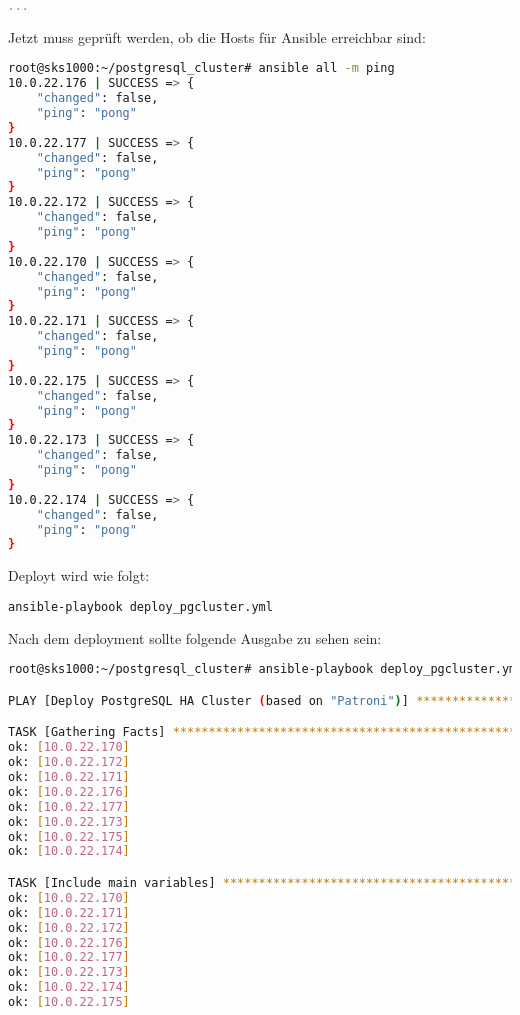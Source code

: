 \begin{flushleft}
\begin{lstlisting}[language=yaml, caption=Testsystem - Deployment - main.yml,captionpos=b,label={lst:testsystem-deployment-main.yml},breaklines=true]
...

    \end{lstlisting}
    Jetzt muss geprüft werden, ob die Hosts für Ansible erreichbar sind:
    \lstset{style=gra_codestyle}
    \begin{lstlisting}[language=bash, caption=Deploy - Anhang - Ansible Ping,captionpos=b,label={lst:deploy-appendix-ansible-ping},breaklines=true]
root@sks1000:~/postgresql_cluster# ansible all -m ping
10.0.22.176 | SUCCESS => {
    "changed": false,
    "ping": "pong"
}
10.0.22.177 | SUCCESS => {
    "changed": false,
    "ping": "pong"
}
10.0.22.172 | SUCCESS => {
    "changed": false,
    "ping": "pong"
}
10.0.22.170 | SUCCESS => {
    "changed": false,
    "ping": "pong"
}
10.0.22.171 | SUCCESS => {
    "changed": false,
    "ping": "pong"
}
10.0.22.175 | SUCCESS => {
    "changed": false,
    "ping": "pong"
}
10.0.22.173 | SUCCESS => {
    "changed": false,
    "ping": "pong"
}
10.0.22.174 | SUCCESS => {
    "changed": false,
    "ping": "pong"
}
    \end{lstlisting}

    Deployt wird wie folgt:
    \lstset{style=gra_codestyle}
    \begin{lstlisting}[language=bash, caption=Deploy - Anhang - deploy\_pgcluster.yml,captionpos=b,label={lst:deploy-appendix-pgcluster},breaklines=true]
ansible-playbook deploy_pgcluster.yml
    \end{lstlisting}
    Nach dem deployment sollte folgende Ausgabe zu sehen sein:
    \lstset{style=gra_codestyle}
    \begin{lstlisting}[language=bash, caption=Deploy - Anhang - Deployt,captionpos=b,label={lst:deploy-appendix-deployt},breaklines=true]
root@sks1000:~/postgresql_cluster# ansible-playbook deploy_pgcluster.yml

PLAY [Deploy PostgreSQL HA Cluster (based on "Patroni")] **********************************************************************************************************************************************************

TASK [Gathering Facts] ********************************************************************************************************************************************************************************************
ok: [10.0.22.170]
ok: [10.0.22.172]
ok: [10.0.22.171]
ok: [10.0.22.176]
ok: [10.0.22.177]
ok: [10.0.22.173]
ok: [10.0.22.175]
ok: [10.0.22.174]

TASK [Include main variables] *************************************************************************************************************************************************************************************
ok: [10.0.22.170]
ok: [10.0.22.171]
ok: [10.0.22.172]
ok: [10.0.22.176]
ok: [10.0.22.177]
ok: [10.0.22.173]
ok: [10.0.22.174]
ok: [10.0.22.175]


\end{lstlisting}
\end{flushleft}
